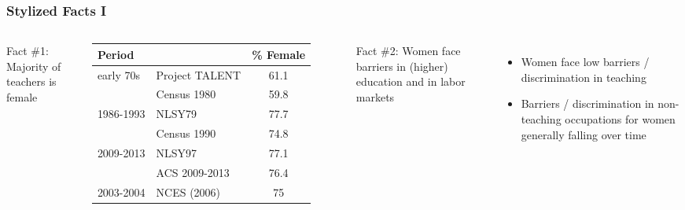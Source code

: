 \documentclass[11pt,hyperref={bookmarks=false},table,aspectratio=169]{beamer}
\begin{document}

\begin{frame}
\frametitle{Stylized Facts I}

\begin{columns}[t]
\alert{Fact \#1: Majority of teachers is female}
		\small{\begin{table}[h!]
			\centering 
			\begin{tabular}{l l c }
				\toprule
				Period & & \% Female \\
				\midrule
                early 70s & Project TALENT  &  61.1 \\
                & Census 1980 &  59.8 \\
                1986-1993 & NLSY79  & 77.7   \\
                & Census 1990 & 74.8 \\
                2009-2013& NLSY97  & 77.1   \\
                & ACS 2009-2013  & 76.4  \\
				\midrule
				2003-2004 & NCES (2006) & 75\\
				\bottomrule
			\end{tabular}
		\end{table}}
\alert{Fact \#2: Women face barriers in (higher) education and in labor markets}
	\small{\begin{itemize}
		\item Women face low barriers / discrimination in teaching
		\item Barriers / discrimination in non-teaching occupations for women generally falling over time
	\end{itemize}}
\end{columns}
\end{frame}
\end{document}
